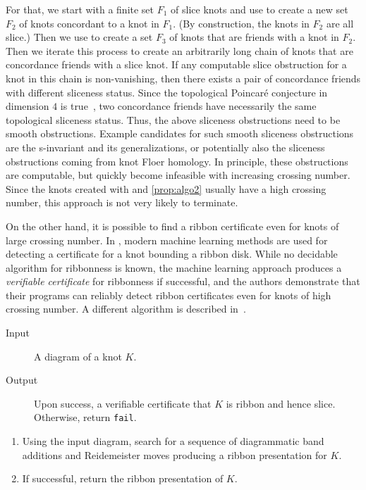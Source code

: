 \documentclass{amsart} %
\theoremstyle{thm}
\theoremstyle{definition}
\numberwithin{equation}{section}
\begin{document}
For that, we start with a finite set $F_1$ of slice knots and use  to create a new set $F_2$ of knots concordant to a knot in $F_1$. (By construction, the knots in $F_2$ are all slice.) Then we use  to create a set $F_3$ of knots that are friends with a knot in $F_2$. Then we iterate this process to create an arbitrarily long chain of knots that are concordance friends with a slice knot. If any computable slice obstruction for a knot in this chain is non-vanishing, then there exists a pair of concordance friends with different sliceness status. Since the topological Poincaré conjecture in dimension $4$ is true~\cite{Freedman}, two concordance friends have necessarily the same topological sliceness status. Thus, the above sliceness obstructions need to be smooth obstructions. Example candidates for such smooth sliceness obstructions are the s-invariant and its generalizations, or potentially also the sliceness obstructions coming from knot Floer homology. In principle, these obstructions are computable, but quickly become infeasible with increasing crossing number. Since the knots created with  and \ref{prop:algo2} usually have a high crossing number, this approach is not very likely to terminate.

On the other hand, it is possible to find a ribbon certificate even for knots of large crossing number. In \cite{ribbons_with_ML}, modern machine learning methods are used for detecting a certificate for a knot bounding a ribbon disk. While no decidable algorithm for ribbonness is known, the machine learning approach produces a \textit{verifiable certificate} for ribbonness if successful, and the authors demonstrate that their programs can reliably detect ribbon certificates even for knots of high crossing number. A different algorithm is described in~\cite{Dunfield_Gong}.

\begin{algorithm}
\caption{Ribbon certificate search \cite{ribbons_with_ML,Dunfield_Gong}}
\label{alg:ml_ribbon_search}
\begin{description}
    \item[Input] A diagram of a knot $K$.
    \item[Output] Upon success, a verifiable certificate that $K$ is ribbon and hence slice. Otherwise, return \texttt{fail}.
\end{description}
\begin{enumerate}
    \item Using the input diagram, search for a sequence of diagrammatic band additions and Reidemeister moves producing a ribbon presentation for $K$.
    \item If successful, return the ribbon presentation of $K$.
\end{enumerate}
\end{algorithm}
\end{document}
